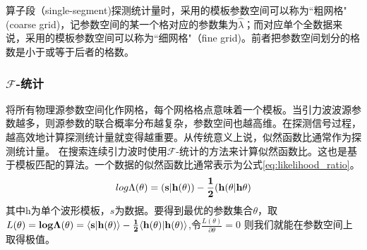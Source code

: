 算子段（single-segment)探测统计量时，采用的模板参数空间可以称为``粗网格"(coarse grid)，记参数空间的某一个格对应的参数集为$\hat{\lambda}$；而对应单个全数据来说，采用的模板参数空间可以称为``细网格"（fine grid)。前者把参数空间划分的格数是小于或等于后者的格数。





\subsubsection*{$\mathcal{F}$-统计}



将所有物理源参数空间化作网格，每个网格格点意味着一个模板。当引力波波源参数越多，则源参数的联合概率分布越复杂，参数空间也越高维。在探测信号过程，越高效地计算探测统计量就变得越重要。从传统意义上说，似然函数比通常作为探测统计量。
\cite{jaranowski1998data, prix2007statistic}在搜索连续引力波时使用$\mathcal{F}$-统计的方法来计算似然函数比。这也是基于模板匹配的算法。一个数据的似然函数比通常表示为公式\ref{eq:likelihood_ratio}。
\begin{equation}
log \Lambda (\bf{\theta}) = (s|h(\bf{\theta}))-\frac{1}{2}(h(\bf{\theta}|h\bf{\theta})
\label{eq:likelihood_ratio}
\end{equation}
其中h为单个波形模板，$s$为数据。要得到最优的参数集合$\theta$，取$L(\bf{\theta})=log\Lambda(\bf{\theta})=\langle{s|h(\theta)}\rangle - \frac{1}{2}\langle h(\theta)|h(\theta) \rangle$,令$\frac{L(\theta)}{\partial \theta}=0$ 则我们就能在参数空间上取得极值。

